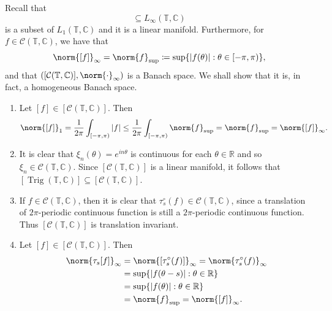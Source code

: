 \documentclass[notoc,notitlepage]{tufte-book}
\DeclareMathOperator{\Trig}{Trig}
\begin{document}
\begin{eg}\label{eg:equivclss_of_cts_2pi_periodic_fns_is_a_hom_ban_sp}
  Recall that
  \begin{equation*}
    [\mathcal{C}(\mathbb{T}, \mathbb{C})] \subseteq L_\infty(\mathbb{T}, \mathbb{C})
  \end{equation*}
  is a subset of $L_1(\mathbb{T}, \mathbb{C})$ and it is a linear manifold.
  Furthermore, for $f \in \mathcal{C}(\mathbb{T}, \mathbb{C})$, we have that
  \begin{equation*}
    \norm{[f]}_{\infty} = \norm{f}_{\sup}
    \coloneqq \sup \{ \abs{f(\theta)} : \theta \in [-\pi, \pi) \},
  \end{equation*}
  and that $([\mathcal{C}(\mathbb{T}, \mathbb{C})], \norm{\cdot}_{\infty})$
  is a Banach space.
  We shall show that it is, in fact, a homogeneous Banach space.

  \begin{enumerate}
    \item Let $[f] \in [\mathcal{C}(\mathbb{T}, \mathbb{C})]$. Then
      \begin{equation*}
        \norm{[f]}_1 = \frac{1}{2\pi} \int_{[-\pi, \pi)} \abs{f}
        \leq \frac{1}{2\pi} \int_{[-\pi, \pi)} \norm{f}_{\sup}
        = \norm{f}_{\sup} = \norm{[f]}_{\infty}.
      \end{equation*}

    \item It is clear that $\xi_n(\theta) = e^{in\theta}$ is continuous
      for each $\theta \in \mathbb{R}$ and so $\xi_n \in \mathcal{C}(\mathbb{T}, \mathbb{C})$.
      Since $[\mathcal{C}(\mathbb{T}, \mathbb{C})]$ is a linear manifold,
      it follows that $[\Trig(\mathbb{T}, \mathbb{C})] \subseteq
      [\mathcal{C}(\mathbb{T}, \mathbb{C})]$.

    \item If $f \in \mathcal{C}(\mathbb{T}, \mathbb{C})$,
      then it is clear that $\tau_s^{\circ}(f) \in \mathcal{C}(\mathbb{T},
      \mathbb{C})$,
      since a translation of $2\pi$-periodic continuous function
      is still a $2\pi$-periodic continuous function.
      Thus $[\mathcal{C}(\mathbb{T}, \mathbb{C})]$ is translation invariant.

    \item Let $[f] \in [\mathcal{C}(\mathbb{T}, \mathbb{C})]$.
      Then
      \begin{align*}
        \norm{\tau_s[f]}_{\infty}
        &= \norm{[\tau_s^{\circ}(f)]}_{\infty}
         = \norm{\tau_s^{\circ}(f)}_{\infty} \\
        &= \sup \{ \abs{f(\theta - s)} : \theta \in \mathbb{R} \} \\
        &= \sup \{ \abs{f(\theta)} : \theta \in \mathbb{R} \} \\
        &= \norm{f}_{\sup} = \norm{[f]}_{\infty}.
      \end{align*}


\end{enumerate}
\end{eg}
\end{document}
